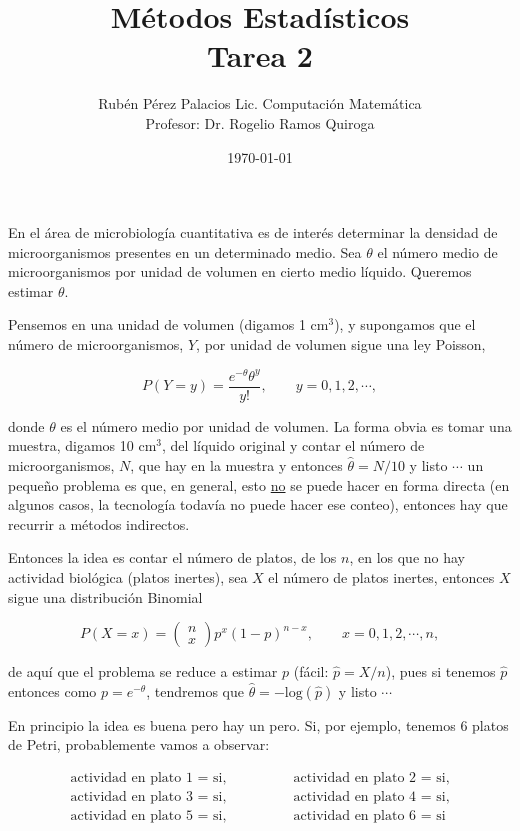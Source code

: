 \documentclass[letterpaper]{article}
\title{Métodos Estadísticos \\ Tarea 2}
\author{Rubén Pérez Palacios Lic. Computación Matemática\\Profesor: Dr. Rogelio Ramos Quiroga}
\date{\today}
\theoremstyle{definition}
\theoremstyle{lemathm}
\theoremstyle{lemathm}
\theoremstyle{lemathm}
\theoremstyle{lemademthm}
\newcommand{\1}{\mathbbm{1}}
\begin{document}
	\maketitle
	En el \'area de microbiolog\'ia cuantitativa es de inter\'es determinar la densidad de microorganismos presentes en un determinado medio. Sea $\theta$ el n\'umero medio de microorganismos por unidad de volumen en cierto medio l\'iquido. Queremos estimar $\theta$.
		
	Pensemos en una unidad de volumen (digamos 1 cm$^3$), y supongamos que el n\'umero de microorganismos, $Y$, por unidad de volumen sigue una ley Poisson, 
	
	\[P(Y=y) = \frac{e^{-\theta}\theta^y}{y!}, \qquad y=0,1,2,\cdots,\]
	
	donde $\theta$ es el n\'umero medio por unidad de volumen. La forma obvia es tomar una muestra, digamos 10 cm$^3$, del l\'iquido original y contar el n\'umero de microorganismos, $N$, que hay en la muestra y entonces $\widehat{\theta} = N/10$ y listo $\cdots$ un peque\~no problema  es que, en general, esto \underline{no} se puede hacer en forma directa (en algunos casos, la tecnolog\'ia todav\'ia no puede hacer ese conteo), entonces hay que  recurrir a m\'etodos indirectos.

	Entonces la idea es contar el n\'umero de platos, de los $n$, en los que no hay actividad biol\'ogica (platos inertes), sea $X$ el n\'umero de platos inertes, entonces $X$ sigue una distribuci\'on Binomial 
	
	\[P(X=x) = \left( \begin{array}{c} n \\ x \end{array} \right) p^x (1-p)^{n-x}, \qquad x = 0,1,2,\cdots,n,\]
	
	de aqu\'i que el problema se reduce a estimar $p$ (f\'acil: $\widehat{p} = X/n$), pues si tenemos $\widehat{p}$ entonces como $p = e^{-\theta}$, tendremos que $\widehat{\theta} = -\text{log}(\widehat{p})$ y listo $\cdots$ 

	En principio la idea es buena pero hay un pero. Si, por ejemplo, tenemos 6 platos de Petri, probablemente vamos a observar:

	\begin{align*}
		\text{actividad en plato 1 = si,} & \qquad \qquad \text{actividad en plato 2 = si,}\\
		\text{actividad en plato 3 = si,} & \qquad \qquad \text{actividad en plato 4 = si,}\\
		\text{actividad en plato 5 = si,} & \qquad \qquad \text{actividad en plato 6 = si}
	\end{align*}
	
\end{document}
